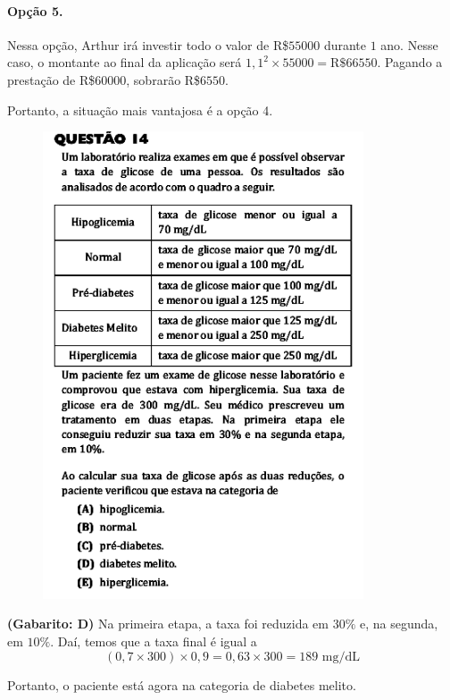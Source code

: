 \documentclass[a4paper]{article}
\begin{document}
\paragraph{Opção 5.} Nessa opção, Arthur irá investir todo o valor de R\$$55000$ durante $1$ ano. Nesse caso, o montante ao final da aplicação será $1,1^2\times 55000 = \text{R\$}66550$. Pagando a prestação de R\$$60000$, sobrarão R\$$6550$.
\par\vspace{0.3cm} Portanto, a situação mais vantajosa é a opção 4.
\begin{figure}[H]
	\begin{center}
		\includegraphics[width=9.5cm]{L3Q14.png}
	\end{center}
\end{figure}
\par\textbf{(Gabarito: D)} Na primeira etapa, a taxa foi reduzida em $30\%$ e, na segunda, em $10\%$. Daí, temos que a taxa final é igual a
\begin{equation*}
(0,7\times 300)\times 0,9 = 0,63\times 300 = 189\text{ mg/dL}
\end{equation*}
\par\vspace{0.3cm} Portanto, o paciente está agora na categoria de diabetes melito.
\end{document}
